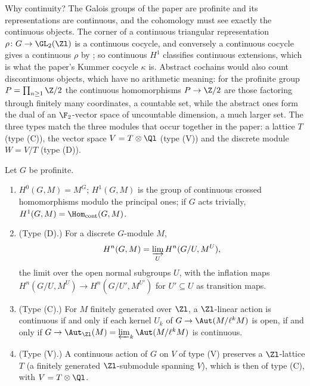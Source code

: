 Why continuity? The Galois groups of the paper are profinite and its representations are continuous, and the cohomology must see exactly the continuous
objects. The corner of a continuous triangular representation $\rho\colon G\to\GL_2(\Zl)$ is a continuous cocycle, and conversely a continuous cocycle gives a
continuous $\rho$ by ; so continuous $H^1$ classifies continuous extensions, which is what the paper's Kummer cocycle $\kappa$ is. Abstract
cochains would also count discontinuous objects, which have no arithmetic meaning: for the profinite group $P=\prod_{n\ge1}\Z/2$ the continuous homomorphisms
$P\to\Z/2$ are those factoring through finitely many coordinates, a countable set, while the abstract ones form the dual of an $\F_2$-vector space of
uncountable dimension, a much larger set. The three types match the three modules that occur together in the paper: a lattice $T$ (type (C)), the vector space $V=T\otimes\Ql$ (type (V)) and the
discrete module $W=V/T$ (type (D)).

\begin{proposition}\label{prop:cohomology:continuous}
Let $G$ be profinite.
\begin{enumerate}[label=(\roman*)]
\item $H^0(G,M)=M^G$; $H^1(G,M)$ is the group of continuous crossed homomorphisms modulo the principal ones; if $G$ acts trivially, $H^1(G,M)=\Hom_{\mathrm{cont}}(G,M)$.
\item (Type (D).) For a discrete $G$-module $M$,
\[
H^n(G,M)=\varinjlim_UH^n(G/U,M^U),
\]
the limit over the open normal subgroups $U$, with the inflation maps $H^n(G/U,M^U)\to H^n(G/U',M^{U'})$ for $U'\subseteq U$ as transition maps.
\item (Type (C).) For $M$ finitely generated over $\Zl$, a $\Zl$-linear action is continuous if and only if each kernel $U_k$ of $G\to\Aut(M/\ell^kM)$ is open,
if and only if $G\to\Aut_{\Zl}(M)=\varprojlim_k\Aut(M/\ell^kM)$ is continuous.
\item (Type (V).) A continuous action of $G$ on $V$ of type (V) preserves a $\Zl$-lattice $T$ (a finitely generated $\Zl$-submodule spanning $V$), which is then of
type (C), with $V=T\otimes\Ql$.
\end{enumerate}
\end{proposition}

